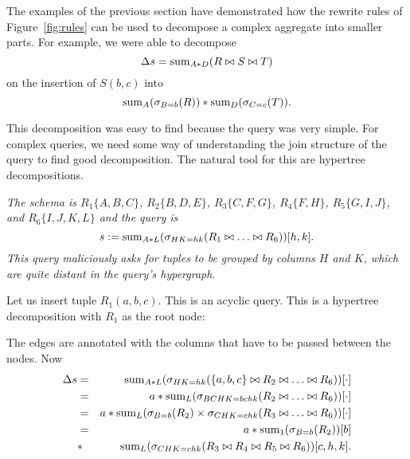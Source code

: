 The examples of the previous section have demonstrated how the rewrite
rules of Figure~\ref{fig:rules} can be used to decompose a complex
aggregate into smaller parts. For example,
we were able to decompose
\[
\Delta s = \mathrm{sum}_{A*D}(R \bowtie S \bowtie T)
\]
on the insertion of $S(b,c)$ into
\[
\mathrm{sum}_{A}(\sigma_{B=b}(R)) * \mathrm{sum}_D(\sigma_{C=c}(T)).
\]

This decomposition was easy to find because the query was
very simple. For complex queries, we need some way of understanding the
join structure of the query to find good decomposition. The natural tool
for this are hypertree decompositions.


\begin{example}\em
The schema is
$R_1\{A,B,C\}$, $R_2\{B,D,E\}$, $R_3\{C,F,G\}$, $R_4\{F,H\}$,  $R_5\{G,I,J\}$,
and $R_6\{I,J,K,L\}$ and
the query is
\[
s := \mathrm{sum}_{A*L}(\sigma_{HK=hk}(R_1 \bowtie \dots \bowtie R_6))[h,k].
\]
This query maliciously asks for tuples to be grouped by columns $H$ and $K$,
which are quite distant in the query's hypergraph. 

Let us insert tuple $R_1(a,b,c)$.
This is an acyclic query. This is a hypertree decomposition with $R_1$ as
the root node:
\comment{
\[
\psset{levelsep=12mm}
\pstree{\TR{\framebox{$R_1\{A,B,C\}$}}}
{
   \TR{\framebox{$R_2\{B,D,E\}$}}^B
   \pstree{\TR{\framebox{$R_3\{C,F,G\}$}}_{C; [H,K]}}
   {
      \TR{\framebox{$R_4\{F,H\}$}}^{F; [H]}
      \pstree{\TR{\framebox{$R_5\{G,I,J\}$}}_{G; [K]}}
      {
         \TR{\framebox{$R_6\{I,J,K,L\}$}}_{I,J; [K]}
      }
   }
}
\]
}

The edges are annotated with the columns that have to be passed between the nodes.
Now
\begin{eqnarray*}
\Delta s &=&
\mathrm{sum}_{A*L}(\sigma_{HK=hk}(\{a,b,c\} \bowtie R_2 \bowtie \dots \bowtie R_6))[\cdot]
\\
&=&
a * \mathrm{sum}_{L}(\sigma_{BCHK=bchk}(R_2 \bowtie \dots \bowtie R_6))[\cdot]
\\
&=&
a * \mathrm{sum}_{L}(\sigma_{B=b}(R_2) \times \sigma_{CHK=chk}(R_3 \bowtie \dots \bowtie R_6))[\cdot]
\\
&=&
a * 
\mathrm{sum}_1(\sigma_{B=b}(R_2))[b] \\
&*& 
\mathrm{sum}_L(\sigma_{CHK=chk}(R_3 \bowtie R_4 \bowtie R_5 \bowtie R_6))[c,h,k].
\end{eqnarray*}


\end{example}
